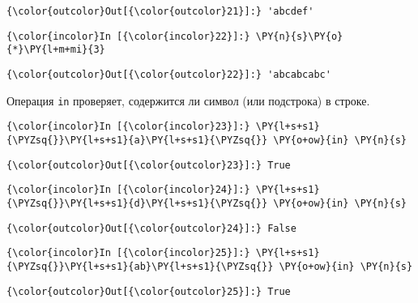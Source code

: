             \begin{Verbatim}[commandchars=\\\{\}]
{\color{outcolor}Out[{\color{outcolor}21}]:} 'abcdef'
\end{Verbatim}
        
    \begin{Verbatim}[commandchars=\\\{\}]
{\color{incolor}In [{\color{incolor}22}]:} \PY{n}{s}\PY{o}{*}\PY{l+m+mi}{3}
\end{Verbatim}

            \begin{Verbatim}[commandchars=\\\{\}]
{\color{outcolor}Out[{\color{outcolor}22}]:} 'abcabcabc'
\end{Verbatim}
        
    Операция \texttt{in} проверяет, содержится ли символ (или подстрока) в
строке.

    \begin{Verbatim}[commandchars=\\\{\}]
{\color{incolor}In [{\color{incolor}23}]:} \PY{l+s+s1}{\PYZsq{}}\PY{l+s+s1}{a}\PY{l+s+s1}{\PYZsq{}} \PY{o+ow}{in} \PY{n}{s}
\end{Verbatim}

            \begin{Verbatim}[commandchars=\\\{\}]
{\color{outcolor}Out[{\color{outcolor}23}]:} True
\end{Verbatim}
        
    \begin{Verbatim}[commandchars=\\\{\}]
{\color{incolor}In [{\color{incolor}24}]:} \PY{l+s+s1}{\PYZsq{}}\PY{l+s+s1}{d}\PY{l+s+s1}{\PYZsq{}} \PY{o+ow}{in} \PY{n}{s}
\end{Verbatim}

            \begin{Verbatim}[commandchars=\\\{\}]
{\color{outcolor}Out[{\color{outcolor}24}]:} False
\end{Verbatim}
        
    \begin{Verbatim}[commandchars=\\\{\}]
{\color{incolor}In [{\color{incolor}25}]:} \PY{l+s+s1}{\PYZsq{}}\PY{l+s+s1}{ab}\PY{l+s+s1}{\PYZsq{}} \PY{o+ow}{in} \PY{n}{s}
\end{Verbatim}

            \begin{Verbatim}[commandchars=\\\{\}]
{\color{outcolor}Out[{\color{outcolor}25}]:} True
\end{Verbatim}
        
